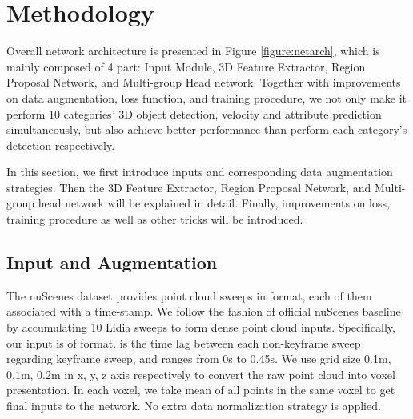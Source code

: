 \documentclass[10pt,twocolumn,letterpaper]{article}
\begin{document}
\section{Methodology} \label{sec:method}
Overall network architecture is presented in Figure \ref{figure:netarch}, which is mainly composed of 4 part: Input Module, 3D Feature Extractor, Region Proposal Network, and Multi-group Head network. Together with improvements on data augmentation, loss function, and training procedure, we not only make it perform 10 categories' 3D object detection, velocity and attribute prediction simultaneously, but also achieve better performance than perform each category's detection respectively.


In this section, we first introduce inputs and corresponding data augmentation strategies. Then the 3D Feature Extractor, Region Proposal Network, and Multi-group head network will be explained in detail. Finally, improvements on loss, training procedure as well as other tricks will be introduced.

\subsection{Input and Augmentation} \label{datasetaug}

The nuScenes dataset provides point cloud sweeps in  format, each of them associated with a time-stamp. We follow the fashion of official nuScenes baseline \cite{nuscenes}  by accumulating 10 Lidia sweeps to form dense point cloud inputs. Specifically, our input is of  format.  is the time lag between each non-keyframe sweep regarding keyframe sweep, and  ranges from 0s to 0.45s. We use grid size 0.1m, 0.1m, 0.2m in x, y, z axis respectively to convert the raw point cloud into voxel presentation. In each voxel, we take mean of all points in the same voxel to get final inputs to the network. No extra data normalization strategy is applied.
\end{document}
